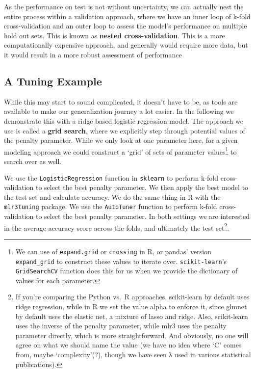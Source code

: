 \documentclass[
  letterpaper,
]{krantz}
\begin{document}
\begin{tcolorbox}[enhanced jigsaw, bottomrule=.15mm, rightrule=.15mm, colframe=quarto-callout-note-color-frame, colback=white, breakable, arc=.35mm, left=2mm, opacityback=0, leftrule=.75mm, toprule=.15mm]

As the performance on test is not without uncertainty, we can actually
nest the entire process within a validation approach, where we have an
inner loop of k-fold cross-validation and an outer loop to assess the
model's performance on multiple hold out sets. This is known as
\textbf{nested cross-validation}. This is a more computationally
expensive approach, and generally would require more data, but it would
result in a more robust assessment of performance

\end{tcolorbox}

\subsection{A Tuning Example}\label{a-tuning-example}

While this may start to sound complicated, it doesn't have to be, as
tools are available to make our generalization journey a lot easier. In
the following we demonstrate this with a ridge based logistic regression
model. The approach we use is called a \textbf{grid search}, where we
explicitly step through potential values of the penalty parameter. While
we only look at one parameter here, for a given modeling approach we
could construct a `grid' of sets of parameter values\footnote{We can use
  of \texttt{expand.grid} or \texttt{crossing} in R, or pandas' version
  \texttt{expand\_grid} to construct these values to iterate over.
  \texttt{scikit-learn}'s \texttt{GridSearchCV} function does this for
  us when we provide the dictionary of values for each parameter.} to
search over as well.

We use the \texttt{LogisticRegression} function in \texttt{sklearn} to
perform k-fold cross-validation to select the best penalty parameter. We
then apply the best model to the test set and calculate accuracy. We do
the same thing in R with the \texttt{mlr3tuning} package. We use the
\texttt{AutoTuner} function to perform k-fold cross-validation to select
the best penalty parameter. In both settings we are interested in the
average accuracy score across the folds, and ultimately the test
set\footnote{If you're comparing the Python vs.~R approaches,
  scikit-learn by default uses ridge regression, while in R we set the
  value alpha to enforce it, since glmnet by default uses the elastic
  net, a mixture of lasso and ridge. Also, scikit-learn uses the inverse
  of the penalty parameter, while mlr3 uses the penalty parameter
  directly, which is more straightforward. And obviously, no one will
  agree on what we should name the value (we have no idea where `C'
  comes from, maybe `complexity'(?), though we have seen λ used in
  various statistical publications).}.
\end{document}
